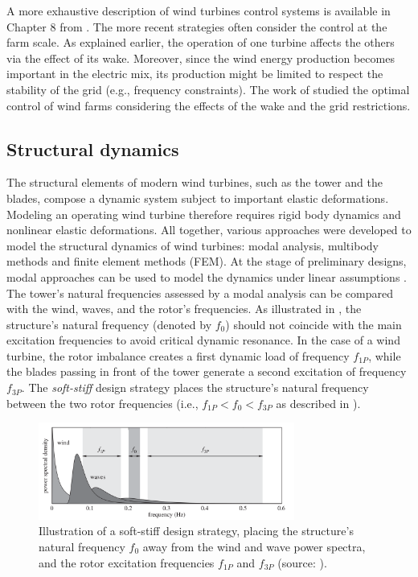 A more exhaustive description of wind turbines control systems is available in Chapter 8 from \citet{burton_2021_wind_handbook}. 
The more recent strategies often consider the control at the farm scale. 
As explained earlier, the operation of one turbine affects the others via the effect of its wake. 
Moreover, since the wind energy production becomes important in the electric mix, its production might be limited to respect the stability of the grid (e.g., frequency constraints).  
The work of \citet{gionfra_2018_control} studied the optimal control of wind farms considering the effects of the wake and the grid restrictions. 

\subsection{Structural dynamics}

The structural elements of modern wind turbines, such as the tower and the blades, compose a dynamic system subject to important elastic deformations. 
Modeling an operating wind turbine therefore requires rigid body dynamics and nonlinear elastic deformations. 
All together, various approaches were developed to model the structural dynamics of wind turbines: modal analysis, multibody methods and finite element methods (FEM). 
At the stage of preliminary designs, modal approaches can be used to model the dynamics under linear assumptions \citep{hegseth_2019_modal_FOWT}. 
The tower's natural frequencies assessed by a modal analysis can be compared with the wind, waves, and the rotor's frequencies. 
As illustrated in , the structure's natural frequency (denoted by $f_0$) should not coincide with the main excitation frequencies to avoid critical dynamic resonance.
In the case of a wind turbine, the rotor imbalance creates a first dynamic load of frequency $f_{1P}$, while the blades passing in front of the tower generate a second excitation of frequency $f_{3P}$.  
The \textit{soft-stiff} design strategy places the structure's natural frequency between the two rotor frequencies (i.e., $f_{1P} < f_0 < f_{3P}$ as described in ). 
\begin{figure}
    \centering
    \includegraphics[width=0.75\textwidth]{./part1/figures/modal_analysis.png}
    \caption{Illustration of a soft-stiff design strategy, placing the structure's natural frequency $f_0$ away from the wind and wave power spectra, and the rotor excitation frequencies $f_{1P}$ and $f_{3P}$ (source: \citet{kallehave_2015_modal}).}
    \label{fig:modal_analysis}
\end{figure}

